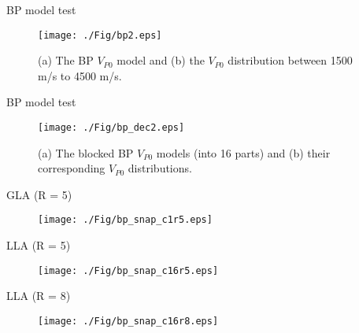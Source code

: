 \documentclass[aspectratio=43]{beamer}
\begin{document}
\begin{frame}{BP model test}
  \begin{figure}
  \texttt{[image: ./Fig/bp2.eps]}
  \caption {(a) The BP $V_{P0}$ model and (b) the $V_{P0}$ distribution between 1500 m/s to 4500 m/s.}
  \end{figure}
\end{frame}
\begin{frame}{BP model test}
  \begin{figure}
  \texttt{[image: ./Fig/bp\_dec2.eps]}
  \caption {
(a) The blocked BP $V_{P0}$ models (into 16 parts) and (b) their corresponding $V_{P0}$ distributions.
}
  \end{figure}
\end{frame}
\begin{frame}{GLA (R = 5)}
   \begin{figure}[ht]
   \texttt{[image: ./Fig/bp\_snap\_c1r5.eps]}
   \end{figure}
\end{frame}
\begin{frame}{LLA (R = 5)}
   \begin{figure}[ht]
   \texttt{[image: ./Fig/bp\_snap\_c16r5.eps]}
   \end{figure}
\end{frame}
\begin{frame}{LLA (R = 8)}
   \begin{figure}[ht]
   \texttt{[image: ./Fig/bp\_snap\_c16r8.eps]}
   \end{figure}
\end{frame}
\end{document}
